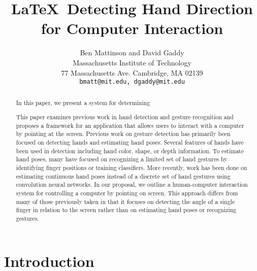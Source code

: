 \documentclass[10pt,twocolumn,letterpaper]{article}
\begin{document}
\title{\LaTeX\ Detecting Hand Direction for Computer Interaction}

\author{Ben Mattinson and David Gaddy\\
Massachusetts Institute of Technology\\
77 Massachusetts Ave. Cambridge, MA 02139\\
{\tt\small bmatt@mit.edu, dgaddy@mit.edu}
}

\maketitle

\begin{abstract}
In this paper, we present a system for determining 

   This paper examines previous work in hand detection and gesture recognition and proposes a framework for an application that allows users to interact with a computer by pointing at the screen. Previous work on gesture detection has primarily been focused on detecting hands and estimating hand poses. Several features of hands have been used in detection including hand color, shape, or depth information. To estimate hand poses, many have focused on recognizing a limited set of hand gestures by identifying finger positions or training classifiers. More recently, work has been done on estimating continuous hand poses instead of a discrete set of hand gestures using convolution neural networks.
In our proposal, we outline a human-computer interaction system for controlling a computer by pointing on screen. This approach differs from many of those previously taken in that it focuses on detecting the angle of a single finger in relation to the screen rather than on estimating hand poses or recognizing gestures.
\end{abstract}

\section{Introduction}
\end{document}
